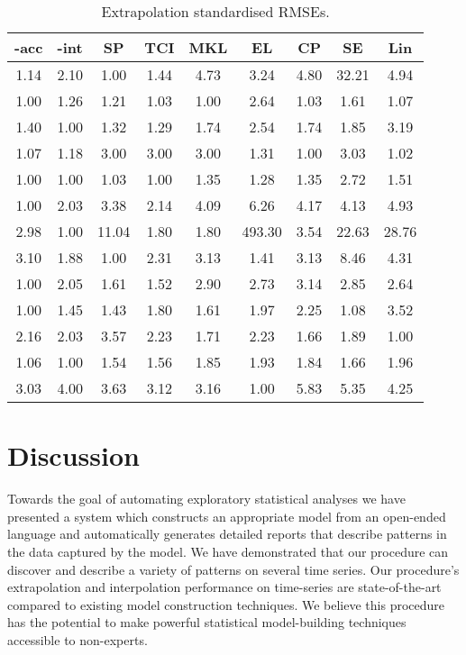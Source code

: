 \begin{table*}[ht]
\center
\begin{tabular}{|c|c|c|c|c|c|c|c|c|}
\hline
\procedurename{}-acc & \procedurename{}-int & SP & TCI & MKL & EL & CP & SE & Lin \\
\hline
1.14 & 2.10 & 1.00 & 1.44 & 4.73 & 3.24 & 4.80 & 32.21 & 4.94\\
1.00 & 1.26 & 1.21 & 1.03 & 1.00 & 2.64 & 1.03 & 1.61 & 1.07\\
1.40 & 1.00 & 1.32 & 1.29 & 1.74 & 2.54 & 1.74 & 1.85 & 3.19\\
1.07 & 1.18 & 3.00 & 3.00 & 3.00 & 1.31 & 1.00 & 3.03 & 1.02\\
1.00 & 1.00 & 1.03 & 1.00 & 1.35 & 1.28 & 1.35 & 2.72 & 1.51\\
1.00 & 2.03 & 3.38 & 2.14 & 4.09 & 6.26 & 4.17 & 4.13 & 4.93\\
2.98 & 1.00 & 11.04 & 1.80 & 1.80 & 493.30 & 3.54 & 22.63 & 28.76\\
3.10 & 1.88 & 1.00 & 2.31 & 3.13 & 1.41 & 3.13 & 8.46 & 4.31\\
1.00 & 2.05 & 1.61 & 1.52 & 2.90 & 2.73 & 3.14 & 2.85 & 2.64\\
1.00 & 1.45 & 1.43 & 1.80 & 1.61 & 1.97 & 2.25 & 1.08 & 3.52\\
2.16 & 2.03 & 3.57 & 2.23 & 1.71 & 2.23 & 1.66 & 1.89 & 1.00\\
1.06 & 1.00 & 1.54 & 1.56 & 1.85 & 1.93 & 1.84 & 1.66 & 1.96\\
3.03 & 4.00 & 3.63 & 3.12 & 3.16 & 1.00 & 5.83 & 5.35 & 4.25\\
\hline
\end{tabular}
\caption{Extrapolation standardised RMSEs.}
\label{table:extrap}
\end{table*}

\section{Discussion}
\label{sec:description:discussion}

Towards the goal of automating exploratory statistical analyses we have presented a system which constructs an appropriate model from an open-ended language and automatically generates detailed reports that describe patterns in the data captured by the model.
We have demonstrated that our procedure can discover and describe a variety of patterns on several time series.
Our procedure's extrapolation and interpolation performance on time-series are state-of-the-art compared to existing model construction techniques.
We believe this procedure has the potential to make powerful statistical model-building techniques accessible to non-experts.

